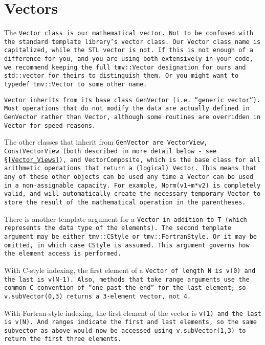 
\section{Vectors}
\label{Vector}

The \tt{Vector} class is our mathematical vector.  Not to be confused with
the standard template library's \tt{vector} class.  
Our \tt{Vector} class name is capitalized, while the STL \tt{vector} is not.
If this is not enough of a difference for you, and you are using both extensively in your code,
we recommend keeping the full \tt{tmv::Vector} designation for ours and \tt{std::vector}
for theirs to distinguish them.  Or you might want to \tt{typedef tmv::Vector} to some other name.

\tt{Vector} inherits from its base class \tt{GenVector} (i.e. ``generic vector'').
Most operations that do not 
modify the data are actually defined in \tt{GenVector} rather than \tt{Vector}, although
some routines are overridden in \tt{Vector} for speed reasons.  

The other classes that inherit from \tt{GenVector} are \tt{VectorView}, 
\tt{ConstVectorView} (both described in more detail below - see \S\ref{Vector_Views}), and
\tt{VectorComposite}, which is the base class for all arithmetic operations that
return a (logical) \tt{Vector}.  This means that any of these other objects can be used
any time a \tt{Vector} can be used in a non-assignable capacity.  For example,
\tt{Norm(v1+m*v2)} is completely valid, and will automatically create the necessary
temporary \tt{Vector} to store the result of the mathematical operation in the parentheses.

There is another template argument for a \tt{Vector} in addition to \tt{T} (which
represents the data type of the elements).  The second template argument
may be either \tt{tmv::CStyle} or \tt{tmv::FortranStyle}.  Or it may be omitted,
in which case \tt{CStyle} is assumed.  This argument governs how the element
access is performed.

With C-style indexing, the first element of a \tt{Vector} of length \tt{N} is 
\tt{v(0)} and the last is \tt{v(N-1)}.  Also, methods that take range arguments
use the common C convention of ``one-past-the-end'' for the last element;
so \tt{v.subVector(0,3)} returns a 3-element vector, not 4.

With Fortran-style indexing, the first element of the vector is \tt{v(1)} and the 
last is \tt{v(N)}.  And ranges indicate the first and last elements, so the same
subvector as above would now be accessed using \tt{v.subVector(1,3)} to return
the first three elements.

